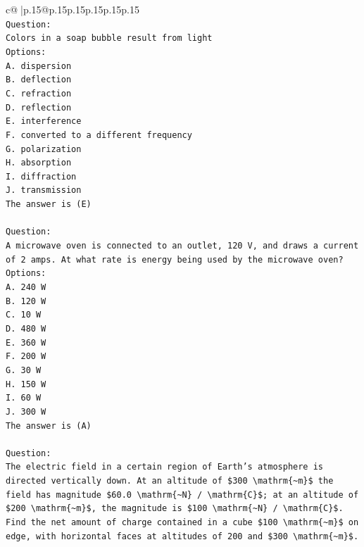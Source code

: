 \documentclass{article}
\begin{document}
{\begin{supertabular}{c@{$\;$}|p{.15\linewidth}@{}p{.15\linewidth}p{.15\linewidth}p{.15\linewidth}p{.15\linewidth}p{.15\linewidth}}
{{{\\ 
\texttt{Question:} \\
\texttt{Colors in a soap bubble result from light} \\
\texttt{Options:} \\
\texttt{A. dispersion} \\
\texttt{B. deflection} \\
\texttt{C. refraction} \\
\texttt{D. reflection} \\
\texttt{E. interference} \\
\texttt{F. converted to a different frequency} \\
\texttt{G. polarization} \\
\texttt{H. absorption} \\
\texttt{I. diffraction} \\
\texttt{J. transmission} \\
\texttt{The answer is (E)} \\
\\ 
\texttt{Question:} \\
\texttt{A microwave oven is connected to an outlet, 120 V, and draws a current of 2 amps. At what rate is energy being used by the microwave oven?} \\
\texttt{Options:} \\
\texttt{A. 240 W} \\
\texttt{B. 120 W} \\
\texttt{C. 10 W} \\
\texttt{D. 480 W} \\
\texttt{E. 360 W} \\
\texttt{F. 200 W} \\
\texttt{G. 30 W} \\
\texttt{H. 150 W} \\
\texttt{I. 60 W} \\
\texttt{J. 300 W} \\
\texttt{The answer is (A)} \\
\\ 
\texttt{Question:} \\
\texttt{The electric field in a certain region of Earth's atmosphere is directed vertically down. At an altitude of \$300 \textbackslash{}mathrm\{\textasciitilde{}m\}\$ the field has magnitude \$60.0 \textbackslash{}mathrm\{\textasciitilde{}N\} / \textbackslash{}mathrm\{C\}\$; at an altitude of \$200 \textbackslash{}mathrm\{\textasciitilde{}m\}\$, the magnitude is \$100 \textbackslash{}mathrm\{\textasciitilde{}N\} / \textbackslash{}mathrm\{C\}\$. Find the net amount of charge contained in a cube \$100 \textbackslash{}mathrm\{\textasciitilde{}m\}\$ on edge, with horizontal faces at altitudes of 200 and \$300 \textbackslash{}mathrm\{\textasciitilde{}m\}\$.} \\
}}}
\end{supertabular}}
\end{document}
